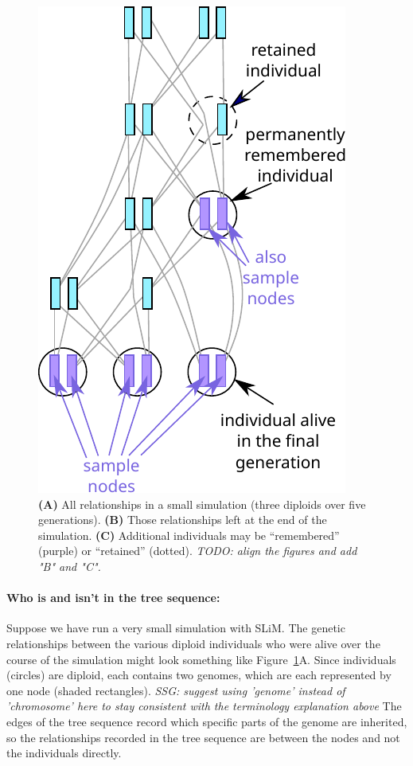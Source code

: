 \documentclass[12pt]{article}
\newcommand{\comment}[1]{\textit{\color{green} #1}}
\begin{document}
\begin{figure}
    \includegraphics{figures/pedigree_remember}
\caption{
    \textbf{(A)} All relationships in a small simulation
    (three diploids over five generations).
    \textbf{(B)} Those relationships left at the end of the simulation.
    \textbf{(C)} Additional individuals may be ``remembered'' (purple)
        or ``retained'' (dotted).
    \comment{TODO: align the figures and add "B" and "C".}
}
\label{fig:indivs}
\end{figure}

\paragraph{Who is and isn't in the tree sequence:}
Suppose we have run a very small simulation with SLiM. The genetic relationships between
the various diploid individuals who were alive over the course of the simulation might
look something like Figure~\ref{fig:indivs}A. Since individuals (circles) are diploid, each contains
two genomes, which are each represented by one node (shaded rectangles).
\comment{SSG: suggest using 'genome' instead of 'chromosome' here to stay consistent with the terminology explanation above}
The edges of the tree sequence record which specific parts of the genome are inherited,
so the relationships recorded in the tree sequence are between the nodes and not the individuals directly.
\end{document}
